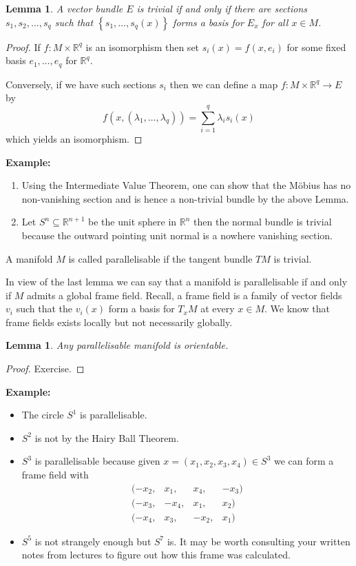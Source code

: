 \documentclass[11pt]{article}
\newcommand{\R}{\mathbb{R}}
\newenvironment{defin}
	{\begin{mdframed}[backgroundcolor=white, roundcorner=5pt, linewidth=1pt, linecolor=RoyalBlue]
		\setlength{\parindent}{0pt}}
	{\end{mdframed}}
\newcommand{\mdf}[1]{{\color{RoyalBlue} #1}}
\newenvironment{eg}
	{\begin{mdframed}[backgroundcolor=mylg,roundcorner=5pt,linewidth=0pt]\bfseries{Example:}\normalfont
	\setlength{\parindent}{0pt}}
	{\end{mdframed}}
\newtheorem{lemma}[theorem]{Lemma}
\begin{document}
\begin{lemma}
A vector bundle $E$ is trivial if and only if there are sections $s_1, s_2, \dots, s_q$ such that $\left\{s_1, \dots, s_q(x)\right\}$ forms a basis for $E_x$ for all $x\in M$.
\end{lemma}
\begin{proof}
If $f:M\times \R^q$ is an isomorphism then set $s_i(x)=f(x, e_i)$ for some fixed basis $e_1, \dots , e_q$ for $\R^q$.

Conversely, if we have such sections $s_i$ then we can define a map $f:M\times \R^q \to E$ by
\[
	f(x, (\lambda_1, \dots , \lambda_q))=\sum_{i=1}^{q}\lambda_i s_i(x)
\]
which yields an isomorphism.
\end{proof}
\begin{eg}
	\begin{enumerate}
		\item Using the Intermediate Value Theorem, one can show that the M\"obius has no non-vanishing section and is hence a non-trivial bundle by the above Lemma.
		\item Let $S^n\subseteq\R^{n+1}$ be the unit sphere in $\R^n$ then the normal bundle is trivial because the outward pointing unit normal is a nowhere vanishing section.
	\end{enumerate}
\end{eg}

\begin{defin}
	A manifold $M$ is called \mdf{parallelisable} if the tangent bundle $TM$ is trivial.
\end{defin}

In view of the last lemma we can say that a manifold is parallelisable if and only if $M$ admits a global frame field.
Recall, a frame field is a family of vector fields $v_i$ such that the $v_i(x)$ form a basis for $T_x M$ at every $x\in M$.
We know that frame fields exists locally but not necessarily globally.

\begin{lemma}
Any parallelisable manifold is orientable.
\end{lemma}
\begin{proof}
Exercise.
\end{proof}

\begin{eg}
	\begin{itemize}
		\item The circle $S^1$ is parallelisable.
		\item $S^2$ is not by the Hairy Ball Theorem.
		\item $S^3$ is parallelisable because given $x=(x_1, x_2, x_3, x_4)\in S^3$ we can form a frame field with
			\[
			\begin{array}{rrrr}
				(-x_2,& x_1,& x_4,& -x_3)\\
				(-x_3,&- x_4,& x_1,& x_2)\\
				(-x_4,& x_3,& -x_2,& x_1)
			\end{array}
			\]
		\item $S^5$ is not strangely enough but $S^7$ is.
			It may be worth consulting your written notes from lectures to figure out how this frame was calculated.
	\end{itemize}
\end{eg}
\end{document}
